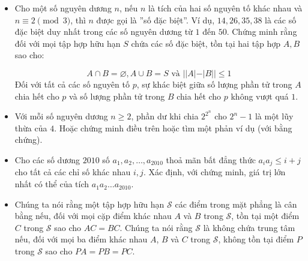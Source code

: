 \documentclass[11pt]{scrartcl}
\begin{document}
\begin{itemize}[label=, leftmargin=0em, itemsep=-0em]

    \item \begin{btvn}
    Cho một số nguyên dương $n$, nếu $n$ là tích của hai số nguyên tố khác nhau và $n \equiv 2 \pmod{3}$, thì $n$ được gọi là ''số đặc biệt''. Ví dụ, $14, 26, 35, 38$ là các số đặc biệt duy nhất trong các số nguyên dương từ $1$ đến $50$. Chứng minh rằng đối với mọi tập hợp hữu hạn $S$ chứa các số đặc biệt, tồn tại hai tập hợp $A, B$ sao cho:
    
    \[A \cap B = \varnothing,A \cup B = S
    \text{ và }||A| - |B|| \leq 1\]
    Đối với tất cả các số nguyên tố $p$, sự khác biệt giữa số lượng phần tử trong $A$ chia hết cho $p$ và số lượng phần tử trong $B$ chia hết cho $p$ không vượt quá $1$.
    \end{btvn}



    \item \begin{btvn}
        Với mỗi số nguyên dương $n\geq2$, phần dư khi chia $2^{2^n}$ cho $2^n-1$ là một lũy thừa của $4$. Hoặc chứng minh điều trên hoặc tìm một phản ví dụ (với bằng chứng).
    \end{btvn}

    \item \begin{btvn}
        Cho các số dương $2010$ số $a_1, a_2, \ldots , a_{2010}$ thoả mãn bất đẳng thức $a_ia_j \le i+j$ cho tất cả các chỉ số khác nhau $i, j$. Xác định, với chứng minh, giá trị lớn nhất có thể của tích $a_1a_2\ldots a_{2010}$.
    \end{btvn}

    \item \begin{btvn}
        Chúng ta nói rằng một tập hợp hữu hạn $\mathcal{S}$ các điểm trong mặt phẳng là cân bằng nếu, đối với mọi cặp điểm khác nhau $A$ và $B$ trong $\mathcal{S}$, tồn tại một điểm $C$ trong $\mathcal{S}$ sao cho $AC=BC$. Chúng ta nói rằng $\mathcal{S}$ là không chứa trung tâm nếu, đối với mọi ba điểm khác nhau $A$, $B$ và $C$ trong $\mathcal{S}$, không tồn tại điểm $P$ trong $\mathcal{S}$ sao cho $PA=PB=PC$.


\end{btvn}
\end{itemize}
\end{document}

